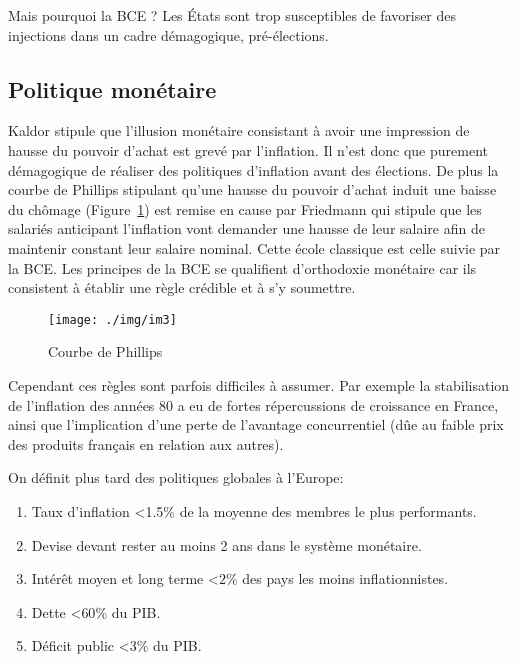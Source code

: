 Mais pourquoi la BCE ? Les États sont trop susceptibles de favoriser des injections dans un cadre démagogique, pré-élections. 

\subsection{Politique monétaire} %
\label{sub:politique_monetaire}

Kaldor stipule que l'illusion monétaire consistant à avoir une impression de hausse du pouvoir d'achat est grevé par l'inflation. Il n'est donc que purement 
démagogique de réaliser des politiques d'inflation avant des élections. De plus la courbe de Phillips stipulant qu'une hausse du pouvoir d'achat induit 
une baisse du chômage (Figure~\ref{fig:courbe_phillips}) est remise en cause par Friedmann qui stipule que les salariés anticipant l'inflation vont demander une hausse de
leur salaire afin de maintenir constant leur salaire nominal. Cette école classique est celle suivie par la BCE. Les principes de la BCE se qualifient 
d'orthodoxie monétaire car ils consistent à établir une règle crédible et à s'y soumettre. 
\begin{figure}[h]
	\begin{center}
		\texttt{[image: ./img/im3]}
		
	\end{center}
	\caption{Courbe de Phillips}
  \label{fig:courbe_phillips}
\end{figure}
\newpage

Cependant ces règles sont parfois difficiles à assumer. Par exemple la stabilisation de l'inflation des années 80 a eu de fortes répercussions de croissance  en France, ainsi que l'implication d'une perte de l'avantage concurrentiel (dûe au faible prix des produits français en relation aux autres).

On définit plus tard des politiques globales à l'Europe: 
\begin{enumerate}
	\item Taux d'inflation <1.5$\%$ de la moyenne des membres le plus performants.
	\item Devise devant rester au moins 2 ans dans le système monétaire.
	\item Intérêt moyen et long terme <$2\%$ des pays les moins inflationnistes.
	\item Dette <$60\%$ du PIB.
	\item Déficit public <$3\%$ du PIB.
	
\end{enumerate}

